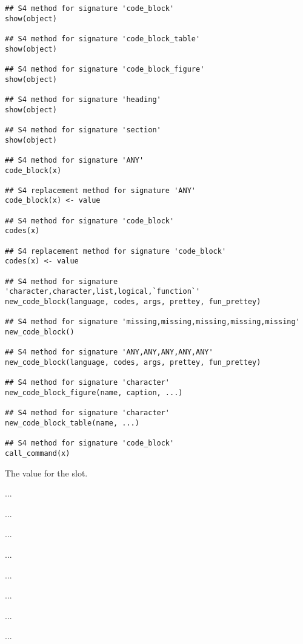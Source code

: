 \documentclass[letterpaper]{book}
\begin{document}
\begin{Usage}
\begin{verbatim}
## S4 method for signature 'code_block'
show(object)

## S4 method for signature 'code_block_table'
show(object)

## S4 method for signature 'code_block_figure'
show(object)

## S4 method for signature 'heading'
show(object)

## S4 method for signature 'section'
show(object)

## S4 method for signature 'ANY'
code_block(x)

## S4 replacement method for signature 'ANY'
code_block(x) <- value

## S4 method for signature 'code_block'
codes(x)

## S4 replacement method for signature 'code_block'
codes(x) <- value

## S4 method for signature 'character,character,list,logical,`function`'
new_code_block(language, codes, args, prettey, fun_prettey)

## S4 method for signature 'missing,missing,missing,missing,missing'
new_code_block()

## S4 method for signature 'ANY,ANY,ANY,ANY,ANY'
new_code_block(language, codes, args, prettey, fun_prettey)

## S4 method for signature 'character'
new_code_block_figure(name, caption, ...)

## S4 method for signature 'character'
new_code_block_table(name, ...)

## S4 method for signature 'code_block'
call_command(x)
\end{verbatim}
\end{Usage}
%
\begin{Arguments}
\begin{ldescription}
\item[\code{value}] The value for the slot.

\item[\code{language}] ...

\item[\code{codes}] ...

\item[\code{args}] ...

\item[\code{prettey}] ...

\item[\code{fun\_prettey}] ...

\item[\code{name}] ...

\item[\code{caption}] ...

\item[\code{...}] ...
\end{ldescription}
\end{Arguments}
\end{document}
